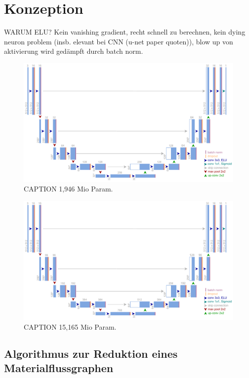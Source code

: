 \chapter{Konzeption} %


WARUM ELU? 
Kein vanishing gradient, recht schnell zu berechnen, kein dying neuron problem (insb. elevant bei CNN (u-net paper quoten)), blow up von aktivierung wird gedämpft durch batch norm. 

\begin{figure}
	\centering
	\includegraphics[width=1.\textwidth]{Bilder/own-unet-2mil.pdf} 
	\caption{CAPTION 1,946 Mio Param.}
	\label{fig:own-unet-2mil}
\end{figure} 

\begin{figure}
	\centering
	\includegraphics[width=1.\textwidth]{Bilder/own-unet-15mil.pdf} 
	\caption{CAPTION 15,165 Mio Param.}
	\label{fig:own-unet-15mil}
\end{figure} 

\section{Algorithmus zur Reduktion eines Materialflussgraphen} \label{sec:reduction}

